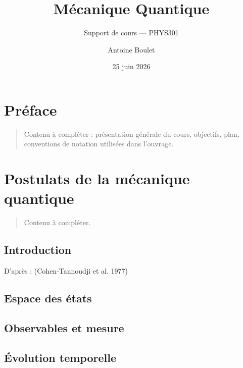 \documentclass[
  french,
  11pt,
  letterpaper,
]{book}
\title{Mécanique Quantique}
\subtitle{Support de cours --- PHYS301}
\author{Antoine Boulet}
\date{25 juin 2026}
\renewcommand*\contentsname{Table des matières}
\newcommand\contentsname{Table des matières}
\begin{document}
\frontmatter
\maketitle

\renewcommand*\contentsname{Table des matières}
{
\setcounter{tocdepth}{2}
\tableofcontents
}

\mainmatter
{}

\chapter*{Préface}\label{pruxe9face}


\begin{quote}
Contenu à compléter : présentation générale du cours, objectifs, plan,
conventions de notation utilisées dans l'ouvrage.
\end{quote}


\chapter{Postulats de la mécanique
quantique}\label{postulats-de-la-muxe9canique-quantique}

\begin{quote}
Contenu à compléter.
\end{quote}

\section{Introduction}\label{introduction}

D'après : (Cohen-Tannoudji et al. 1977)

\section{Espace des états}\label{espace-des-uxe9tats}

\section{Observables et mesure}\label{observables-et-mesure}

\section{Évolution temporelle}\label{uxe9volution-temporelle}
\end{document}
